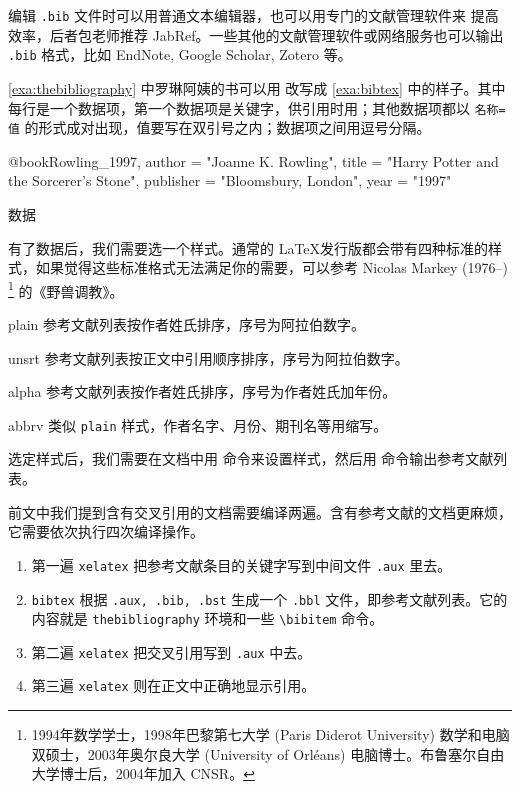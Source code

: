 编辑 \texttt{.bib} 文件时可以用普通文本编辑器，也可以用专门的文献管理软件来
提高效率，后者包老师推荐 JabRef。一些其他的文献管理软件或网络服务也可以输出 \texttt{.bib} 格式，比如 EndNote, Google Scholar, Zotero 等。

\autoref{exa:thebibliography} 中罗琳阿姨的书可以用 \BibTeX 改写成 \autoref{exa:bibtex} 中的样子。其中每行是一个数据项，第一个数据项是关键字，供引用时用；其他数据项都以 \texttt{名称=值} 的形式成对出现，值要写在双引号之内；数据项之间用逗号分隔。

\begin{example}[htbp]
\begin{Code}[]
@book{Rowling_1997,
  author    = "Joanne K. Rowling",
  title     = "Harry Potter and the Sorcerer's Stone",
  publisher = "Bloomsbury, London",
  year      = "1997"
}
\end{Code}
\caption{\BibTeX 数据}
\label{exa:bibtex}
\end{example}

有了数据后，我们需要选一个样式。通常的 \LaTeX 发行版都会带有四种标准的样式，如果觉得这些标准格式无法满足你的需要，可以参考 Nicolas Markey (1976--)\indexMarkey{} \footnote{1994年数学学士，1998年巴黎第七大学 (Paris Diderot University) 数学和电脑双硕士，2003年奥尔良大学 (University of Orléans) 电脑博士。布鲁塞尔自由大学博士后，2004年加入 CNSR。} 的《野兽调教》\citep{Markey_beast}。

\begin{compactdesc}
  \item [plain] 参考文献列表按作者姓氏排序，序号为阿拉伯数字。
  \item [unsrt] 参考文献列表按正文中引用顺序排序，序号为阿拉伯数字。
  \item [alpha] 参考文献列表按作者姓氏排序，序号为作者姓氏加年份。
  \item [abbrv] 类似 \texttt{plain} 样式，作者名字、月份、期刊名等用缩写。
\end{compactdesc}

选定样式后，我们需要在文档中用 \verb|| 命令来设置样式，然后用 \verb|| 命令输出参考文献列表。

\begin{Code}[numbers=none]


\end{Code}

前文中我们提到含有交叉引用的文档需要编译两遍。含有参考文献的文档更麻烦，它需要依次执行四次编译操作。

\begin{enumerate}
  \item 第一遍 \texttt{xelatex} 把参考文献条目的关键字写到中间文件 \texttt{.aux}  里去。
  \item \texttt{bibtex} 根据 \texttt{.aux, .bib, .bst} 生成一个 \texttt{.bbl}  文件，即参考文献列表。它的内容就是 \texttt{thebibliography} 环境和一些 \verb|\bibitem| 命令。
  \item 第二遍 \texttt{xelatex} 把交叉引用写到 \texttt{.aux} 中去。
  \item 第三遍 \texttt{xelatex} 则在正文中正确地显示引用。
\end{enumerate}

